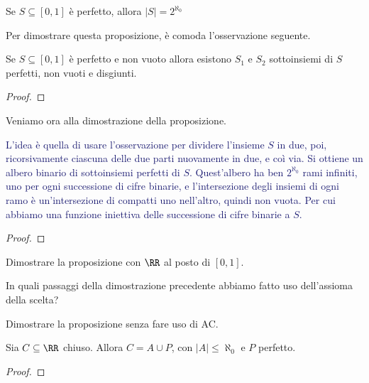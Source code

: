 \documentclass[11pt]{scrartcl}
\begin{document}
\begin{proposition}
	Se $S \subseteq [0,1]$ è perfetto, allora $|S| = 2^{\aleph_0}$
\end{proposition}

Per dimostrare questa proposizione, è comoda l'osservazione seguente.

\begin{remark}
	Se $S \subseteq [0,1]$ è perfetto e non vuoto allora esistono $S_1$ e $S_2$ sottoinsiemi di $S$ perfetti, non vuoti e disgiunti.
\end{remark}

\begin{proof}
	
\end{proof}

Veniamo ora alla dimostrazione della proposizione.

\textcolor{MidnightBlue}{L'idea è quella di usare l'osservazione per dividere l'insieme $S$ in due, poi, ricorsivamente ciascuna delle due parti nuovamente in due, e coì via.
Si ottiene un albero binario di sottoinsiemi perfetti di $S$. Quest'albero ha ben $2^{\aleph_0}$ rami infiniti, uno per ogni successione di cifre binarie, e l'intersezione degli insiemi di ogni ramo 
è un'intersezione di compatti uno nell'altro, quindi non vuota. Per cui abbiamo una funzione iniettiva delle successione di cifre binarie a $S$.}

\begin{proof}
	
\end{proof}

\begin{exercise}
	Dimostrare la proposizione con $\RR$ al posto di $[0,1]$.
\end{exercise}

\begin{exercise}
	In quali passaggi della dimostrazione precedente abbiamo fatto uso dell'assioma della scelta?
\end{exercise}

\begin{exercise}
	Dimostrare la proposizione senza fare uso di AC.
\end{exercise}

\begin{theorem}
	Sia $C \subseteq \RR$ chiuso. Allora $C = A \cup P$, con $|A| \leq \aleph_0$ e $P$ perfetto.
\end{theorem}

\begin{proof}
	
\end{proof}
\end{document}
